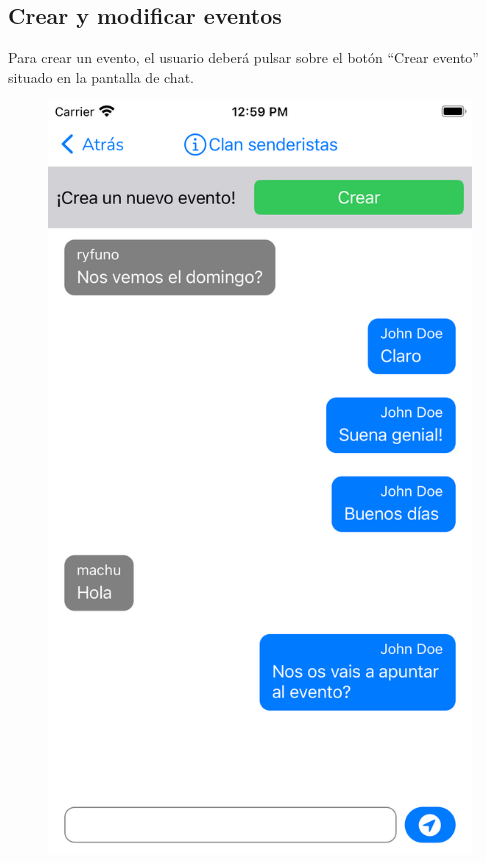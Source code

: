 \begin{appendices}
\section{Crear y modificar eventos}
Para crear un evento, el usuario deberá pulsar sobre el botón ``Crear evento'' situado en la pantalla de chat.
\begin{figure}[H]
        \centering
        \begin{minipage}{0.3\textwidth}
            \centering
            \includegraphics[cframe=black 2pt,width=1\linewidth]{images/manual/crearEvento.png}

\end{minipage}
\end{figure}
\end{appendices}
